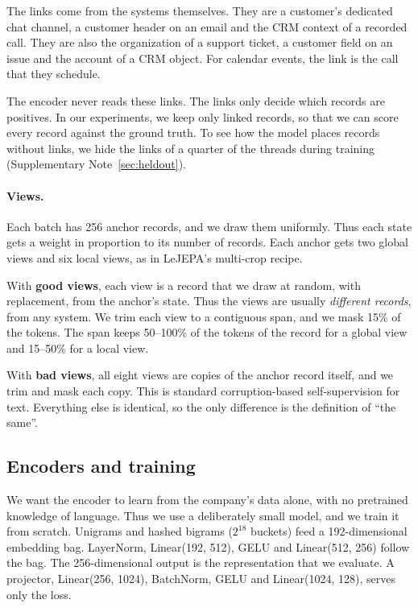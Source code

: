 \documentclass[11pt]{article}
\newcommand{\good}{\textcolor{goodblue}{\textbf{good views}}}
\begin{document}
The links come from the systems themselves. They are a customer's dedicated chat channel, a customer header on an email and the CRM context of a recorded call. They are also the organization of a support ticket, a customer field on an issue and the account of a CRM object. For calendar events, the link is the call that they schedule.

The encoder never reads these links. The links only decide which records are positives. In our experiments, we keep only linked records, so that we can score every record against the ground truth. To see how the model places records without links, we hide the links of a quarter of the threads during training (Supplementary Note~\ref{sec:heldout}).

\paragraph{Views.}
Each batch has 256 anchor records, and we draw them uniformly. Thus each state gets a weight in proportion to its number of records. Each anchor gets two global views and six local views, as in LeJEPA's multi-crop recipe.

With \good, each view is a record that we draw at random, with replacement, from the anchor's state. Thus the views are usually \emph{different records}, from any system. We trim each view to a contiguous span, and we mask 15\% of the tokens. The span keeps 50--100\% of the tokens of the record for a global view and 15--50\% for a local view.

With \textcolor{badorange}{\textbf{bad views}}, all eight views are copies of the anchor record itself, and we trim and mask each copy. This is standard corruption-based self-supervision for text. Everything else is identical, so the only difference is the definition of ``the same''.

\subsection{Encoders and training}
We want the encoder to learn from the company's data alone, with no pretrained knowledge of language. Thus we use a deliberately small model, and we train it from scratch. Unigrams and hashed bigrams ($2^{18}$ buckets) feed a 192-dimensional embedding bag. LayerNorm, Linear(192, 512), GELU and Linear(512, 256) follow the bag. The 256-dimensional output is the representation that we evaluate. A projector, Linear(256, 1024), BatchNorm, GELU and Linear(1024, 128), serves only the loss.
\end{document}

